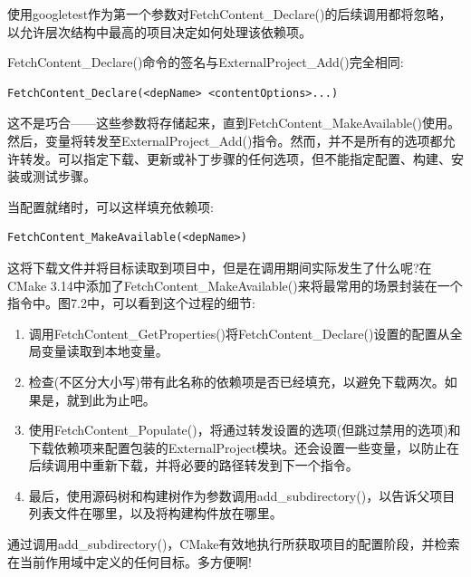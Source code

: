 使用googletest作为第一个参数对FetchContent\_Declare()的后续调用都将忽略，以允许层次结构中最高的项目决定如何处理该依赖项。

FetchContent\_Declare()命令的签名与ExternalProject\_Add()完全相同:

\begin{lstlisting}[style=styleCMake]
FetchContent_Declare(<depName> <contentOptions>...)
\end{lstlisting} 

这不是巧合——这些参数将存储起来，直到FetchContent\_MakeAvailable()使用。然后，变量将转发至ExternalProject\_Add()指令。然而，并不是所有的选项都允许转发。可以指定下载、更新或补丁步骤的任何选项，但不能指定配置、构建、安装或测试步骤。

当配置就绪时，可以这样填充依赖项:

\begin{lstlisting}[style=styleCMake]
FetchContent_MakeAvailable(<depName>)
\end{lstlisting} 

这将下载文件并将目标读取到项目中，但是在调用期间实际发生了什么呢?在CMake 3.14中添加了FetchContent\_MakeAvailable()来将最常用的场景封装在一个指令中。图7.2中，可以看到这个过程的细节:

\begin{enumerate}
\item 
调用FetchContent\_GetProperties()将FetchContent\_Declare()设置的配置从全局变量读取到本地变量。

\item 
检查(不区分大小写)带有此名称的依赖项是否已经填充，以避免下载两次。如果是，就到此为止吧。

\item 
使用FetchContent\_Populate()，将通过转发设置的选项(但跳过禁用的选项)和下载依赖项来配置包装的ExternalProject模块。还会设置一些变量，以防止在后续调用中重新下载，并将必要的路径转发到下一个指令。

\item 
最后，使用源码树和构建树作为参数调用add\_subdirectory()，以告诉父项目列表文件在哪里，以及将构建构件放在哪里。
\end{enumerate}

通过调用add\_subdirectory()，CMake有效地执行所获取项目的配置阶段，并检索在当前作用域中定义的任何目标。多方便啊!

